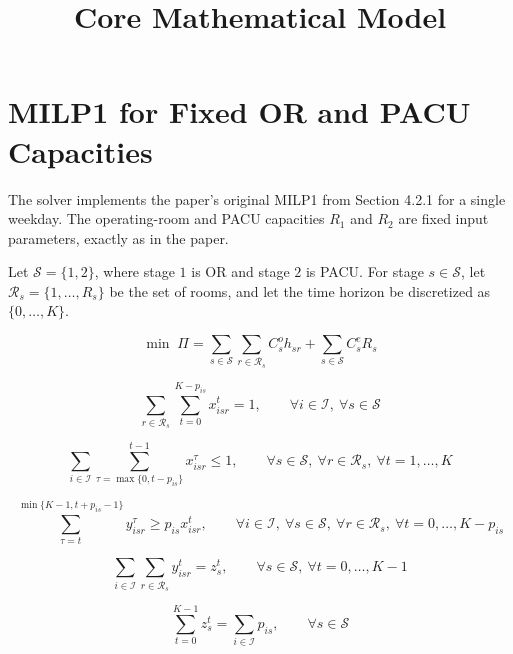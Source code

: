 \documentclass{article}
\title{Core Mathematical Model}
\date{}
\begin{document}
\maketitle

\section*{MILP1 for Fixed OR and PACU Capacities}

The solver implements the paper's original MILP1 from Section 4.2.1 for a
single weekday. The operating-room and PACU capacities $R_1$ and $R_2$ are
fixed input parameters, exactly as in the paper.

Let $\mathcal{S} = \{1,2\}$, where stage $1$ is OR and stage $2$ is PACU. For
stage $s \in \mathcal{S}$, let $\mathcal{R}_s = \{1,\ldots,R_s\}$ be the set of
rooms, and let the time horizon be discretized as $\{0,\ldots,K\}$.

\begin{equation}
\min \; \Pi =
\sum_{s \in \mathcal{S}} \sum_{r \in \mathcal{R}_s} C_s^o h_{sr}
+
\sum_{s \in \mathcal{S}} C_s^e R_s
\tag{1}
\end{equation}

\begin{equation}
\sum_{r \in \mathcal{R}_s} \sum_{t=0}^{K-p_{is}} x_{isr}^t = 1,
\qquad
\forall i \in \mathcal{I},\ \forall s \in \mathcal{S}
\tag{2}
\end{equation}

\begin{equation}
\sum_{i \in \mathcal{I}} \sum_{\tau=\max\{0,t-p_{is}\}}^{t-1} x_{isr}^{\tau} \le 1,
\qquad
\forall s \in \mathcal{S},\ \forall r \in \mathcal{R}_s,\ \forall t = 1,\ldots,K
\tag{3}
\end{equation}

\begin{equation}
\sum_{\tau=t}^{\min\{K-1,t+p_{is}-1\}} y_{isr}^{\tau} \ge p_{is} x_{isr}^t,
\qquad
\forall i \in \mathcal{I},\ \forall s \in \mathcal{S},\ \forall r \in \mathcal{R}_s,\ \forall t = 0,\ldots,K-p_{is}
\tag{4}
\end{equation}

\begin{equation}
\sum_{i \in \mathcal{I}} \sum_{r \in \mathcal{R}_s} y_{isr}^t = z_s^t,
\qquad
\forall s \in \mathcal{S},\ \forall t = 0,\ldots,K-1
\tag{5}
\end{equation}

\begin{equation}
\sum_{t=0}^{K-1} z_s^t = \sum_{i \in \mathcal{I}} p_{is},
\qquad
\forall s \in \mathcal{S}
\tag{6}
\end{equation}
\end{document}
